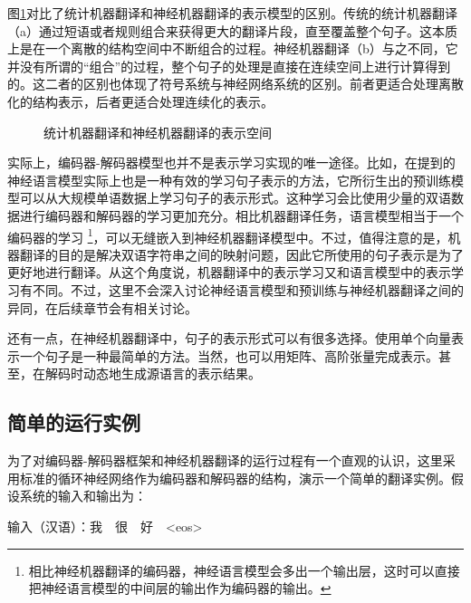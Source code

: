 \parinterval 图\ref{fig:10-6}对比了统计机器翻译和神经机器翻译的表示模型的区别。传统的统计机器翻译（a）通过短语或者规则组合来获得更大的翻译片段，直至覆盖整个句子。这本质上是在一个离散的结构空间中不断组合的过程。神经机器翻译（b）与之不同，它并没有所谓的“组合”的过程，整个句子的处理是直接在连续空间上进行计算得到的。这二者的区别也体现了符号系统与神经网络系统的区别。前者更适合处理离散化的结构表示，后者更适合处理连续化的表示。

\begin{figure}[htp]
    \centering
    
    \caption{统计机器翻译和神经机器翻译的表示空间}
    \label{fig:10-6}
\end{figure}

\parinterval 实际上，编码器-解码器模型也并不是表示学习实现的唯一途径。比如，在{\chapternine}提到的神经语言模型实际上也是一种有效的学习句子表示的方法，它所衍生出的预训练模型可以从大规模单语数据上学习句子的表示形式。这种学习会比使用少量的双语数据进行编码器和解码器的学习更加充分。相比机器翻译任务，语言模型相当于一个编码器的学习 \footnote{相比神经机器翻译的编码器，神经语言模型会多出一个输出层，这时可以直接把神经语言模型的中间层的输出作为编码器的输出。}，可以无缝嵌入到神经机器翻译模型中。不过，值得注意的是，机器翻译的目的是解决双语字符串之间的映射问题，因此它所使用的句子表示是为了更好地进行翻译。从这个角度说，机器翻译中的表示学习又和语言模型中的表示学习有不同。不过，这里不会深入讨论神经语言模型和预训练与神经机器翻译之间的异同，在后续章节会有相关讨论。

\parinterval 还有一点，在神经机器翻译中，句子的表示形式可以有很多选择。使用单个向量表示一个句子是一种最简单的方法。当然，也可以用矩阵、高阶张量完成表示。甚至，在解码时动态地生成源语言的表示结果。

\subsection{简单的运行实例}

\parinterval 为了对编码器-解码器框架和神经机器翻译的运行过程有一个直观的认识，这里采用标准的循环神经网络作为编码器和解码器的结构，演示一个简单的翻译实例。假设系统的输入和输出为：

\vspace{0.5em}
\parinterval  \hspace{5em} 输入（汉语）：我\ \ 很\ \  好\ \ <eos>

